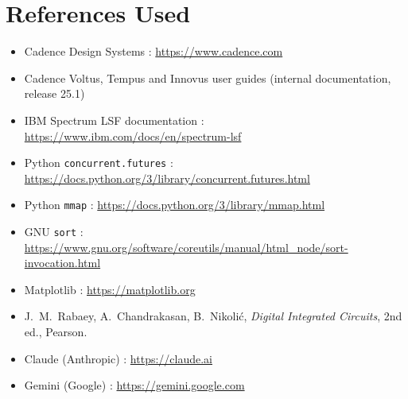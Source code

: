 \documentclass[11pt,a4paper]{article}
\newcommand{\fn}[1]{\texttt{#1}}                 %
\begin{document}
\section{References Used}
\begin{itemize}
  \item Cadence Design Systems : \url{https://www.cadence.com}
  \item Cadence Voltus, Tempus and Innovus user guides (internal documentation, release 25.1)
  \item IBM Spectrum LSF documentation : \url{https://www.ibm.com/docs/en/spectrum-lsf}
  \item Python \fn{concurrent.futures} : \url{https://docs.python.org/3/library/concurrent.futures.html}
  \item Python \fn{mmap} : \url{https://docs.python.org/3/library/mmap.html}
  \item GNU \fn{sort} : \url{https://www.gnu.org/software/coreutils/manual/html_node/sort-invocation.html}
  \item Matplotlib : \url{https://matplotlib.org}
  \item J.~M.~Rabaey, A.~Chandrakasan, B.~Nikoli\'c, \textit{Digital Integrated Circuits}, 2nd ed., Pearson.
  \item Claude (Anthropic) : \url{https://claude.ai}
  \item Gemini (Google) : \url{https://gemini.google.com}
\end{itemize}
\end{document}
